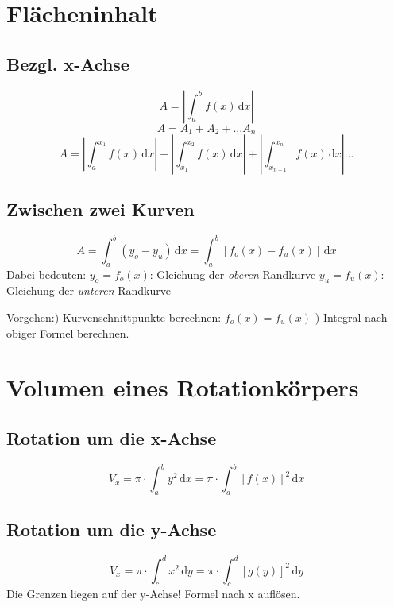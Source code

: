 \section{Flächeninhalt} %
\label{sec:flächeninhalt}
\subsection{Bezgl. x-Achse} %
\label{sub:bezgl_x_achse}
\[ A = \left| \int_a^b f(x)\,\mathrm{d}x \right|\]
\[ A = A_1 + A_2 + ... A_n\]
\[ A = \left| \int_a^{x_1} f(x)\,\mathrm{d}x \right| + \left| \int_{x_1}^{x_2} f(x)\,\mathrm{d}x \right| + \left| \int_{x_{n-1}}^{x_n} f(x)\,\mathrm{d}x \right| ... \]
\subsection{Zwischen zwei Kurven} %
\label{sub:zwischen_zwei_kurven}
\[ A = \int_a^b (y_o - y_u)\,\mathrm{d}x = \int_a^b [f_o(x) - f_u(x)]\,\mathrm{d}x\]
Dabei bedeuten:\newline
\( y_o = f_o(x)\): Gleichung der \emph{oberen} Randkurve\newline
\( y_u = f_u(x)\): Gleichung der \emph{unteren} Randkurve

Vorgehen:) Kurvenschnittpunkte berechnen:\newline
\(f_o(x) = f_u(x)\) ) Integral nach obiger Formel berechnen.


\section{Volumen eines Rotationkörpers} %
\label{sec:volumen_eines_rotationkörpers}
\subsection{Rotation um die x-Achse} %
\label{sub:rotation_um_die_x_achse}
\[ V_x = \pi \cdot \int_a^b y^2\,\mathrm{d}x = \pi \cdot \int_a^b [f(x)]^2\,\mathrm{d}x \]
\subsection{Rotation um die y-Achse} %
\label{sub:rotation_um_die_y_achse}
\[ V_x = \pi \cdot \int_c^d x^2\,\mathrm{d}y = \pi \cdot \int_c^d [g(y)]^2\,\mathrm{d}y \]
Die Grenzen liegen auf der y-Achse! Formel nach x auflösen.
